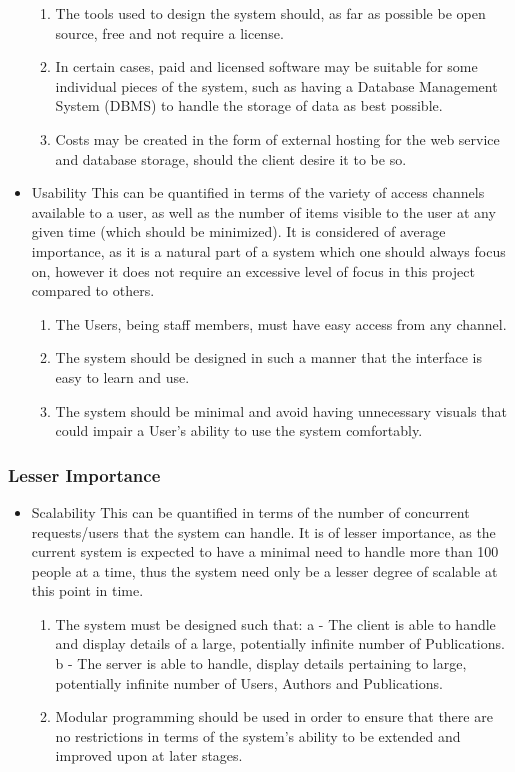 \documentclass[hidelinks,a4paper,12pt]{article}
\begin{document}
\begin{itemize}
				\begin{enumerate}
					\item The tools used to design the system should, as far as possible be open source, free and not require a license.
					\item In certain cases, paid and licensed software may be suitable for some individual pieces of the system, such as having a Database Management System (DBMS) to handle the storage of data as best possible.
					\item Costs may be created in the form of external hosting for the web service and database storage, should the client desire it to be so.
				\end{enumerate}
				\item Usability
				This can be quantified in terms of the variety of access channels available to a user, as well as the number of items visible to the user at any given time (which should be minimized). It is considered of average importance, as it is a natural part of a system which one should always focus on, however it does not require an excessive level of focus in this project compared to others.
				\begin{enumerate}
					\item The Users, being staff members, must have easy access from any channel.
					\item The system should be designed in such a manner that the interface is easy to learn and use.
					\item The system should be minimal and avoid having unnecessary visuals that could impair a User's ability to use the system comfortably.
				\end{enumerate}
			\end{itemize}
		\subsubsection{Lesser Importance}
		\begin{itemize}
			\item Scalability
			This can be quantified in terms of the number of concurrent requests/users that the system can handle. It is of lesser importance, as the current system is expected to have a minimal need to handle more than 100 people at a time, thus the system need only be a lesser degree of scalable at this point in time.
			\begin{enumerate}
				\item The system must be designed such that:
				\newline
				a - The client is able to handle and display details of a large, potentially infinite number of Publications.\newline
				b - The server is able to handle, display details pertaining to large, potentially infinite number of Users, Authors and Publications.	
				\item Modular programming should be used in order to ensure that there are no restrictions in terms of the system's ability to be extended and improved upon at later stages.
			\end{enumerate}
		\end{itemize}
		
\end{document}
